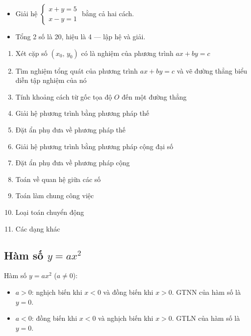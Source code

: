 \documentclass[12pt,a4paper]{article}
\begin{document}
\begin{vidu}
  \begin{itemize}
    \item Giải hệ $\begin{cases} x + y = 5 \\ x - y = 1 \end{cases}$ bằng cả hai cách.
    \item Tổng 2 số là 20, hiệu là 4 --- lập hệ và giải.
  \end{itemize}
\end{vidu}

\begin{enumerate}[label=\textbf{Dạng \arabic*:}, leftmargin=*, align=left]
  \item Xét cặp số $(x_0,\, y_0)$ có là nghiệm của phương trình $ax + by = c$
  \item Tìm nghiệm tổng quát của phương trình $ax + by = c$ và vẽ đường thẳng biểu diễn tập nghiệm của nó
  \item Tính khoảng cách từ gốc tọa độ $O$ đến một đường thẳng
  \item Giải hệ phương trình bằng phương pháp thế
  \item Đặt ẩn phụ đưa về phương pháp thế
  \item Giải hệ phương trình bằng phương pháp cộng đại số
  \item Đặt ẩn phụ đưa về phương pháp cộng
  \item Toán về quan hệ giữa các số
  \item Toán làm chung công việc
  \item Loại toán chuyển động
  \item Các dạng khác
\end{enumerate}

\subsection{Hàm số $y = ax^2$}

\begin{dinhnghia}
  Hàm số $y = ax^2$ \quad ($a \neq 0$):
  \begin{itemize}
    \item $a > 0$: nghịch biến khi $x < 0$ và đồng biến khi $x > 0$. GTNN của hàm số là $y = 0$.
    \item $a < 0$: đồng biến khi $x < 0$ và nghịch biến khi $x > 0$. GTLN của hàm số là $y = 0$.
  \end{itemize}
\end{dinhnghia}
\end{document}
